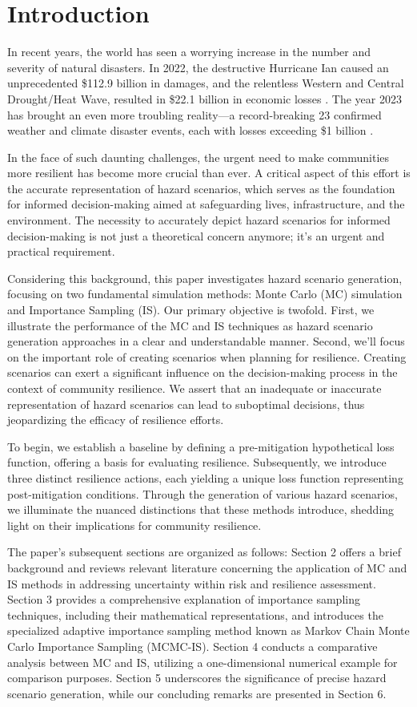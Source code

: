 \section{Introduction}
    In recent years, the world has seen a worrying increase in the number and severity of natural disasters. In 2022, the destructive Hurricane Ian caused an unprecedented \$112.9 billion in damages, and the relentless Western and Central Drought/Heat Wave, resulted in \$22.1 billion in economic losses \cite{noaa_billion-dollar_2023}. The year 2023 has brought an even more troubling reality—a record-breaking 23 confirmed weather and climate disaster events, each with losses exceeding \$1 billion \cite{noaa_assessing_2023}.
    
    In the face of such daunting challenges, the urgent need to make communities more resilient has become more crucial than ever. A critical aspect of this effort is the accurate representation of hazard scenarios, which serves as the foundation for informed decision-making aimed at safeguarding lives, infrastructure, and the environment. The necessity to accurately depict hazard scenarios for informed decision-making is not just a theoretical concern anymore; it's an urgent and practical requirement. 
    
    Considering this background, this paper investigates hazard scenario generation, focusing on two fundamental simulation methods: Monte Carlo (MC) simulation and Importance Sampling (IS).
    Our primary objective is twofold. First, we illustrate the performance of the MC and IS techniques as hazard scenario generation approaches in a clear and understandable manner. Second, we'll focus on the important role of creating scenarios when planning for resilience. Creating scenarios can exert a significant influence on the decision-making process in the context of community resilience. We assert that an inadequate or inaccurate representation of hazard scenarios can lead to suboptimal decisions, thus jeopardizing the efficacy of resilience efforts.
    
    To begin, we establish a baseline by defining a pre-mitigation hypothetical loss function, offering a basis for evaluating resilience. Subsequently, we introduce three distinct resilience actions, each yielding a unique loss function representing post-mitigation conditions. Through the generation of various hazard scenarios, we illuminate the nuanced distinctions that these methods introduce, shedding light on their implications for community resilience.
    
    The paper's subsequent sections are organized as follows: Section 2 offers a brief background and reviews relevant literature concerning the application of MC and IS methods in addressing uncertainty within risk and resilience assessment. Section 3 provides a comprehensive explanation of importance sampling techniques, including their mathematical representations, and introduces the specialized adaptive importance sampling method known as Markov Chain Monte Carlo Importance Sampling (MCMC-IS). Section 4 conducts a comparative analysis between MC and IS, utilizing a one-dimensional numerical example for comparison purposes. Section 5 underscores the significance of precise hazard scenario generation, while our concluding remarks are presented in Section 6.